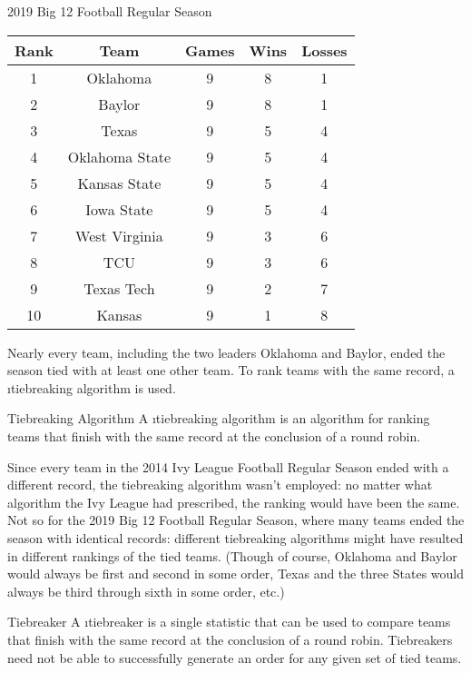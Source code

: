 {    \begin{figg}{2019 Big 12 Football Regular Season}{}
        \centering
        \begin{tabular}{| c | c | c | c | c |}
            \hline
            Rank & Team & Games & Wins & Losses\\ \hline
            1 & Oklahoma & 9 & 8 & 1\\ \hline
            2 & Baylor & 9 & 8 & 1\\ \hline
            3 & Texas & 9 & 5 & 4\\ \hline
            4 & Oklahoma State & 9 & 5 & 4\\ \hline
            5 & Kansas State & 9 & 5 & 4\\ \hline
            6 & Iowa State & 9 & 5 & 4\\ \hline
            7 & West Virginia & 9 & 3 & 6\\ \hline
            8 & TCU & 9 & 3 & 6\\ \hline
            9 & Texas Tech & 9 & 2 & 7\\ \hline
            10 & Kansas & 9 & 1 & 8\\ \hline
        \end{tabular}
    \end{figg}

    Nearly every team, including the two leaders Oklahoma and Baylor, ended the season tied with at least one other team. To rank teams with the same record, a \i{tiebreaking algorithm} is used.

    \begin{definition}{Tiebreaking Algorithm}{}
        A \i{tiebreaking algorithm} is an algorithm for ranking teams that finish with the same record at the conclusion of a round robin.
    \end{definition}

    Since every team in the 2014 Ivy League Football Regular Season ended with a different record, the tiebreaking algorithm wasn't employed: no matter what algorithm the Ivy League had prescribed, the ranking would have been the same. Not so for the 2019 Big 12 Football Regular Season, where many teams ended the season with identical records: different tiebreaking algorithms might have resulted in different rankings of the tied teams. (Though of course, Oklahoma and Baylor would always be first and second in some order, Texas and the three States would always be third through sixth in some order, etc.)

    \begin{definition}{Tiebreaker}{}
        A \i{tiebreaker} is a single statistic that can be used to compare teams that finish with the same record at the conclusion of a round robin. Tiebreakers need not be able to successfully generate an order for any given set of tied teams.
    \end{definition}

}
